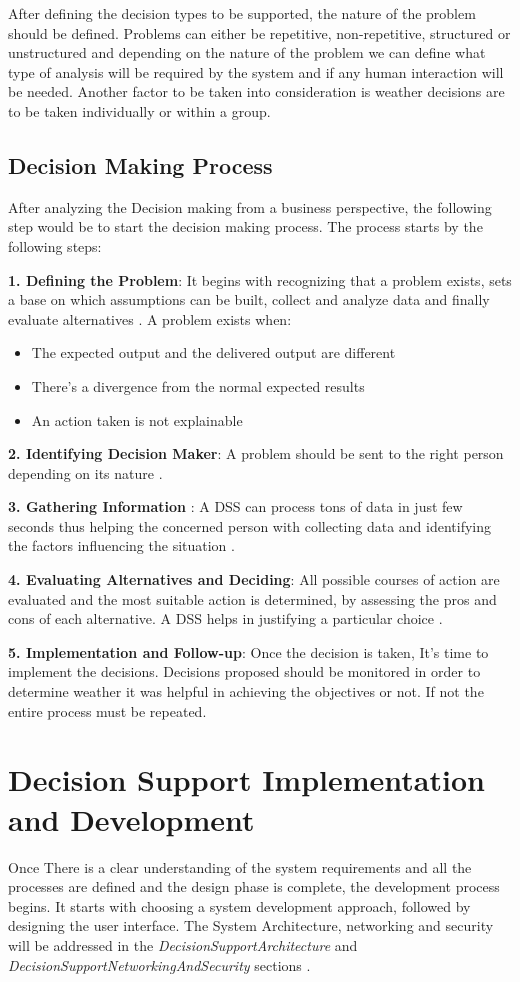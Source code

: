 After defining the decision types to be supported, the nature of the problem should be defined. Problems can either be repetitive, non-repetitive, structured or unstructured and depending on the nature of the problem we can define what type of analysis will be required by the system and if any human interaction will be needed. Another factor to be taken into consideration is weather decisions are to be taken individually or within a group.

\subsection{Decision Making Process}
After analyzing the Decision making from a business perspective, the following step would be to start the decision making process. The process starts by the following steps:

\textbf{1. Defining the Problem}: It begins with recognizing that a problem exists, sets a base on which assumptions can be built, collect and analyze data and finally evaluate alternatives \cite{DSS}. A problem exists when:
\begin{itemize}
\item The expected output and the delivered output are different
\item There’s a divergence from the normal expected results
\item An action taken is not explainable
\end{itemize}

\textbf{2. Identifying Decision Maker}: A problem should be sent to the right person depending on its nature \cite{DSS}.

\textbf{3. Gathering Information} : A DSS can process tons of data in just few seconds thus helping the concerned person with collecting data and identifying the factors influencing the situation \cite{DSS}.

\textbf{4. Evaluating Alternatives and Deciding}: All possible courses of action are evaluated and the most suitable action is determined, by assessing the pros and cons of each alternative. A DSS helps in justifying a particular choice \cite{DSS}.

\textbf{5. Implementation and Follow-up}: Once the decision is taken, It’s time to implement the decisions. Decisions proposed should be monitored in order to determine weather it was helpful in achieving the objectives or not. If not the entire process must be repeated.
\section{Decision Support Implementation and Development}
Once There is a clear understanding of the system requirements and all the processes are defined and the design phase is complete, the development process begins. It starts with choosing a system development approach, followed by designing the user interface. The System Architecture, networking and security will be addressed in the \textit{DecisionSupportArchitecture} and \textit{DecisionSupportNetworkingAndSecurity} sections \cite{DSS}.
